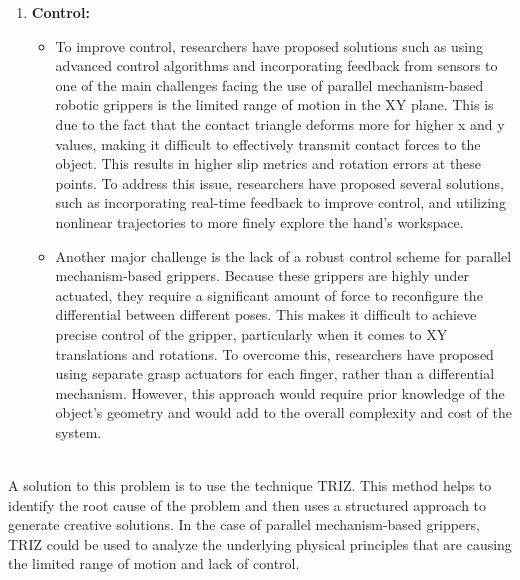 \documentclass[12pt, twoside]{report}
\begin{document}
\begin{enumerate}
    \item \textbf{Control:}
    \begin{itemize}
        \item To improve control, researchers have proposed solutions such as using advanced control algorithms and incorporating feedback from sensors to one of the main challenges facing the use of parallel mechanism-based robotic grippers is the limited range of motion in the XY plane. This is due to the fact that the contact triangle deforms more for higher x and y values, making it difficult to effectively transmit contact forces to the object. This results in higher slip metrics and rotation errors at these points. To address this issue, researchers have proposed several solutions, such as incorporating real-time feedback to improve control, and utilizing nonlinear trajectories to more finely explore the hand's workspace.
        \item Another major challenge is the lack of a robust control scheme for parallel mechanism-based grippers. Because these grippers are highly under actuated, they require a significant amount of force to reconfigure the differential between different poses. This makes it difficult to achieve precise control of the gripper, particularly when it comes to XY translations and rotations. To overcome this, researchers have proposed using separate grasp actuators for each finger, rather than a differential mechanism. However, this approach would require prior knowledge of the object's geometry and would add to the overall complexity and cost of the system.
    \end{itemize}
\end{enumerate}\\


A solution to this problem is to use the technique TRIZ. This method helps to identify the root cause of the problem and then uses a structured approach to generate creative solutions. In the case of parallel mechanism-based grippers, TRIZ could be used to analyze the underlying physical principles that are causing the limited range of motion and lack of control.
\end{document}
